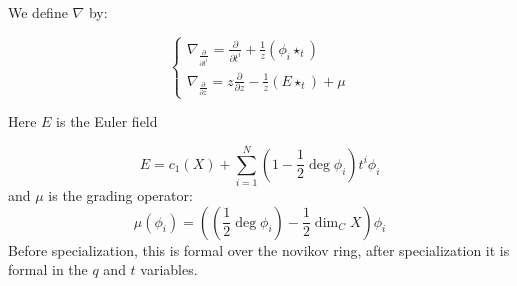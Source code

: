 \documentclass{amsart}
\theoremstyle{definition}
\begin{document}
We define $\nabla$ by:

$$
\left\{\begin{array}{l}
\nabla_{\frac{\partial}{\partial t^i}}=\frac{\partial}{\partial t^i}+\frac{1}{z}\left(\phi_i\star_t \right) \\
\nabla_{\frac{\partial}{\partial z}}=z\frac{\partial}{\partial z}-\frac{1}{z}\left(E\star_t \right)+\mu 
\end{array}\right.
$$

Here $E$ is the Euler field

$$E=c_1(X)+\sum_{i=1}^N (1-\frac{1}{2}\deg\phi_i)t^i\phi_i$$
and  $\mu$ is the grading operator:
$$\mu(\phi_i)=\left(\left(\frac{1}{2}\deg\phi_i\right)-\frac{1}{2}\dim_C X\right)\phi_i$$
Before specialization, this is formal over the novikov ring, after specialization it is formal in the $q$ and $t$ variables.
\end{document}
